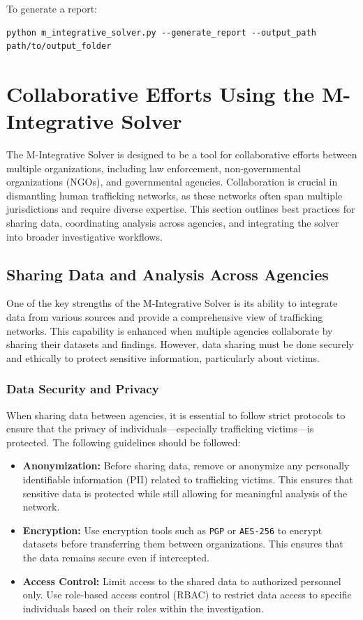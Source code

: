 \documentclass[%
 preprint, linenumbers,
 amsmath,amssymb,
 aps, physrev,
]{revtex4-2}
\begin{document}
To generate a report:
\begin{verbatim}
python m_integrative_solver.py --generate_report --output_path path/to/output_folder
\end{verbatim}

\section{Collaborative Efforts Using the M-Integrative Solver}

The M-Integrative Solver is designed to be a tool for collaborative efforts between multiple organizations, including law enforcement, non-governmental organizations (NGOs), and governmental agencies. Collaboration is crucial in dismantling human trafficking networks, as these networks often span multiple jurisdictions and require diverse expertise. This section outlines best practices for sharing data, coordinating analysis across agencies, and integrating the solver into broader investigative workflows.

\subsection{Sharing Data and Analysis Across Agencies}

One of the key strengths of the M-Integrative Solver is its ability to integrate data from various sources and provide a comprehensive view of trafficking networks. This capability is enhanced when multiple agencies collaborate by sharing their datasets and findings. However, data sharing must be done securely and ethically to protect sensitive information, particularly about victims.

\subsubsection{Data Security and Privacy}

When sharing data between agencies, it is essential to follow strict protocols to ensure that the privacy of individuals—especially trafficking victims—is protected. The following guidelines should be followed:
\begin{itemize}
    \item \textbf{Anonymization:} Before sharing data, remove or anonymize any personally identifiable information (PII) related to trafficking victims. This ensures that sensitive data is protected while still allowing for meaningful analysis of the network.
    \item \textbf{Encryption:} Use encryption tools such as \texttt{PGP} or \texttt{AES-256} to encrypt datasets before transferring them between organizations. This ensures that the data remains secure even if intercepted.
    \item \textbf{Access Control:} Limit access to the shared data to authorized personnel only. Use role-based access control (RBAC) to restrict data access to specific individuals based on their roles within the investigation.
\end{itemize}
\end{document}
